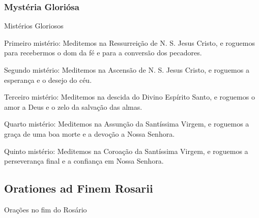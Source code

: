 \subsubsection{Mystéria Gloriósa}
\begin{nscenter}Mistérios Gloriosos\end{nscenter}
\begin{nscenter}\emph{}\end{nscenter}

{\redx Primeiro mistério:} Meditemos na Ressurreição de N. S. Jesus Cristo, e roguemos para recebermos o dom da fé e para a conversão dos pecadores.\par
{\redx Segundo mistério:} Meditemos na Ascensão de N. S. Jesus Cristo, e roguemos a esperança e o desejo do céu.\par
{\redx Terceiro mistério:} Meditemos na descida do Divino Espírito Santo, e roguemos o amor a Deus e o zelo da salvação das almas.\par
{\redx Quarto mistério:} Meditemos na Assunção da Santíssima Virgem, e roguemos a graça de uma boa morte e a devoção a Nossa Senhora.\par
{\redx Quinto mistério:} Meditemos na Coroação da Santíssima Virgem, e roguemos a perseverança final e a confiança em Nossa Senhora.

\subsection{Orationes ad Finem Rosarii}
\begin{nscenter}Orações no fim do Rosário\end{nscenter}

